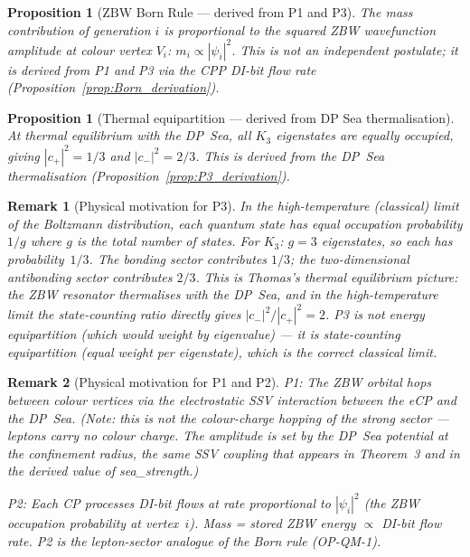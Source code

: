 \documentclass[11pt]{article}
\newtheorem{remark}{Remark}[section]
\newtheorem{proposition}[theorem]{Proposition}
\newcommand{\ZBW}{\mathrm{ZBW}}
\begin{document}
\begin{proposition}[$\ZBW$ Born Rule — derived from P1 and P3]
\label{prop:Born}
The mass contribution of generation $i$ is proportional to the squared
ZBW wavefunction amplitude at colour vertex $V_i$:
$m_i \propto |\psi_i|^2$.
This is \emph{not} an independent postulate; it is derived from P1 and P3
via the CPP DI-bit flow rate (Proposition~\ref{prop:Born_derivation}).
\end{proposition}

\begin{proposition}[Thermal equipartition — derived from DP Sea thermalisation]
\label{post:equip}
At thermal equilibrium with the DP~Sea, all $K_3$ eigenstates are equally
occupied, giving $|c_+|^2 = 1/3$ and $|c_-|^2 = 2/3$.
This is derived from the DP~Sea thermalisation
(Proposition~\ref{prop:P3_derivation}).
\end{proposition}

\begin{remark}[Physical motivation for P3]
In the high-temperature (classical) limit of the Boltzmann distribution,
each quantum state has equal occupation probability $1/g$ where $g$ is
the total number of states.  For $K_3$: $g = 3$ eigenstates, so each
has probability~$1/3$.  The bonding sector contributes $1/3$; the
two-dimensional antibonding sector contributes $2/3$.
This is Thomas's thermal equilibrium picture: the ZBW resonator
thermalises with the DP~Sea, and in the high-temperature limit the
state-counting ratio directly gives $|c_-|^2/|c_+|^2 = 2$.
P3 is \emph{not} energy equipartition (which would weight by eigenvalue)
--- it is state-counting equipartition (equal weight per eigenstate),
which is the correct classical limit.
\end{remark}

\begin{remark}[Physical motivation for P1 and P2]
P1: The ZBW orbital hops between colour vertices via the electrostatic
SSV interaction between the eCP and the DP~Sea.  (Note: this is
\emph{not} the colour-charge hopping of the strong sector — leptons
carry no colour charge. The amplitude is set by the DP~Sea potential
at the confinement radius, the same SSV coupling that appears in
Theorem~3 and in the derived value of sea\_strength.)

P2: Each CP processes DI-bit flows at rate proportional to $|\psi_i|^2$
(the ZBW occupation probability at vertex~$i$).  Mass = stored ZBW energy
$\propto$ DI-bit flow rate.  P2 is the lepton-sector analogue of the
Born rule (OP-QM-1).
\end{remark}
\end{document}
